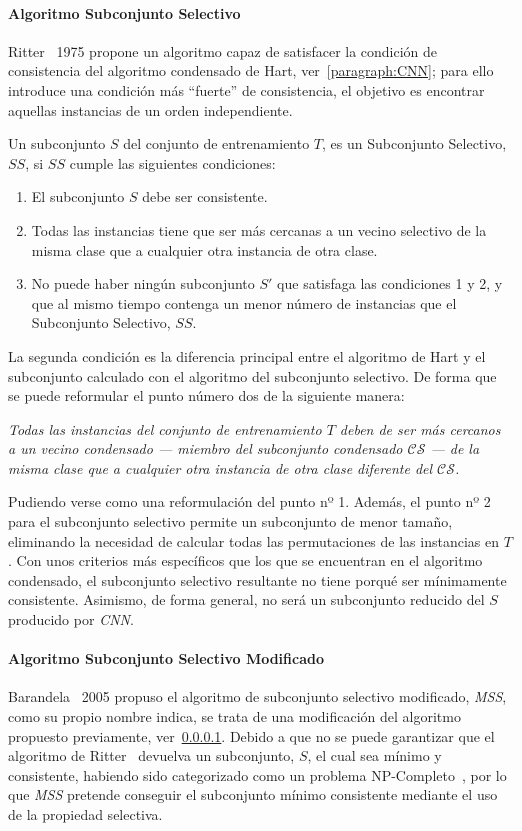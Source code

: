 \paragraph{Algoritmo Subconjunto Selectivo}\label{paragraph:SS}
\hfill \break
Ritter~\cite{ritter1975algorithm} 1975 propone un algoritmo capaz de satisfacer la condición de consistencia del algoritmo condensado de Hart, ver~\ref{paragraph:CNN}; para ello introduce una condición más ``fuerte'' de consistencia, el objetivo es encontrar aquellas instancias de un orden independiente. 

Un subconjunto $S$ del conjunto de entrenamiento $T$, es un Subconjunto Selectivo, $SS$, si $SS$ cumple las siguientes condiciones:
\begin{enumerate}
\item El subconjunto $S$ debe ser consistente.
\item Todas las instancias tiene que ser más cercanas a un vecino selectivo de la misma clase que a cualquier otra instancia de otra clase.
\item No puede haber ningún subconjunto $S'$ que satisfaga las condiciones 1 y 2, y que al mismo tiempo contenga un menor número de instancias que el Subconjunto Selectivo, $SS$.
\end{enumerate}

La segunda condición es la diferencia principal entre el algoritmo de Hart y el subconjunto calculado con el algoritmo del subconjunto selectivo. De forma que se puede reformular el punto número dos de la siguiente manera:

\emph{Todas las instancias del conjunto de entrenamiento $T$ deben de ser más cercanos a un vecino condensado --- miembro del subconjunto condensado $\mathcal{CS}$ --- de la misma clase que a cualquier otra instancia de otra clase diferente del $\mathcal{CS}$.}

Pudiendo verse como una reformulación del punto nº 1. Además, el punto nº  2 para el subconjunto selectivo permite un subconjunto de menor tamaño, eliminando la necesidad de calcular todas las permutaciones de las instancias en $T$. Con unos criterios más específicos que los que se encuentran en el algoritmo condensado, el subconjunto selectivo resultante no tiene porqué ser mínimamente consistente. Asimismo, de forma general, no será un subconjunto reducido del $S$ producido por \textit{CNN}.


\paragraph{Algoritmo Subconjunto Selectivo Modificado}\label{paragraph:MSS}
\hfill \break
Barandela~\cite{barandela2005decision} 2005 propuso el algoritmo de subconjunto selectivo modificado, \textit{MSS}, como su propio nombre indica, se trata de una modificación del algoritmo propuesto previamente, ver~\ref{paragraph:SS}. Debido a que no se puede garantizar que el algoritmo de Ritter~\cite{ritter1975algorithm} devuelva un subconjunto, $S$, el cual sea mínimo y consistente, habiendo sido categorizado como un problema NP-Completo~\cite{wilfong1992nearest}, por lo que \textit{MSS} pretende conseguir el subconjunto mínimo consistente mediante el uso de la propiedad selectiva.

